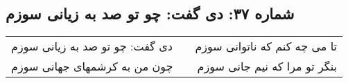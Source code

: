 \begin{center}
\section*{شماره ۳۷: دی گفت: چو تو صد به زیانی سوزم}
\label{sec:037}
\begin{longtable}{l p{0.5cm} r}
دی گفت: چو تو صد به زیانی سوزم
&&
تا می چه کنم که ناتوانی سوزم
\\
چون من به کرشمهای جهانی سوزم
&&
بنگر تو مرا که نیم جانی سوزم
\\
\end{longtable}
\end{center}
